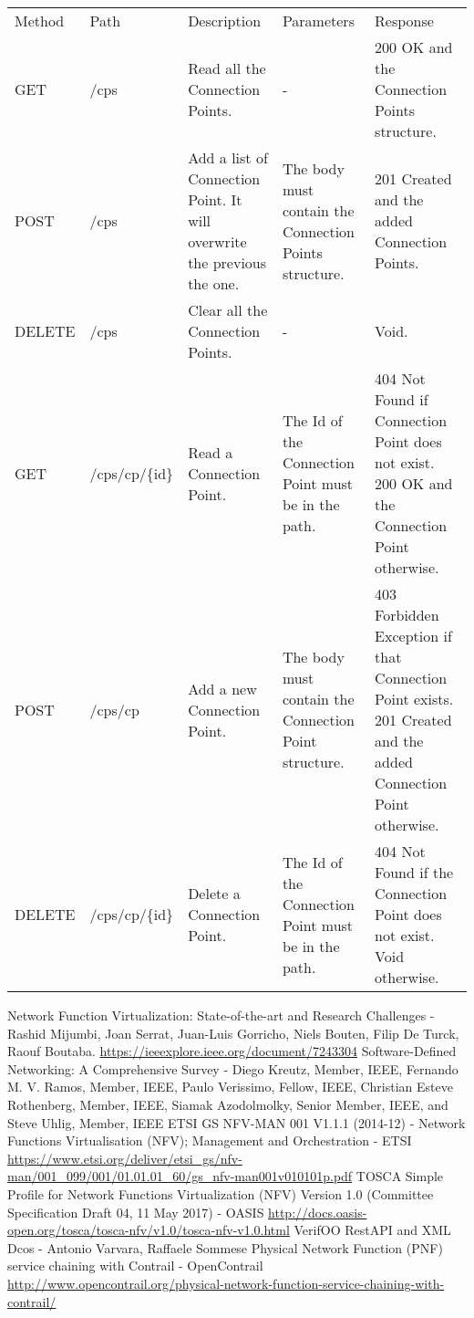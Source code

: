 \documentclass[11pt, english]{article}
\begin{document}
\begin{tabular}{ |p{2cm}|m{3cm}|p{3cm}|p{3cm}|p{4cm}| }
    \hline
    \rowcolor{black} \multicolumn{5}{|c|}{\textcolor{white}{ConnectionPoints}} \\
    \hline
    \rowcolor{Gray}
    Method & Path & Description & Parameters & Response \\
    \hline
    GET   & /cps & Read all the Connection Points. & - & 200 OK and the Connection Points structure. \\
    \hline
    POST & /cps & Add a list of Connection Point. It will overwrite the previous the one. & The body must contain the Connection Points structure. & 201 Created and the added Connection Points. \\
    \hline
    DELETE & /cps & Clear all the Connection Points. & - & Void. \\
    \hline
    GET & /cps/cp/\{id\} & Read a Connection Point. & The Id of the Connection Point must be in the path. & 404 Not Found if Connection Point does not exist. 200 OK and the Connection Point otherwise. \\
    \hline
    POST & /cps/cp & Add a new Connection Point. & The body must contain the Connection Point structure. & 403 Forbidden Exception if that Connection Point exists. 201 Created and the added Connection Point otherwise. \\
    \hline
    DELETE & /cps/cp/\{id\} & Delete a Connection Point. & The Id of the Connection Point must be in the path. & 404 Not Found if the Connection Point does not exist. Void otherwise. \\
    \hline
\end{tabular}

\newpage
\begin{thebibliography}{5}
        Network Function Virtualization: State-of-the-art and Research Challenges - Rashid Mijumbi, Joan Serrat, Juan-Luis Gorricho, Niels Bouten, Filip De Turck, Raouf Boutaba.
        \url{https://ieeexplore.ieee.org/document/7243304}
        Software-Defined Networking: A Comprehensive Survey - Diego Kreutz, Member, IEEE, Fernando M. V. Ramos, Member, IEEE, Paulo Verissimo, Fellow, IEEE, Christian Esteve Rothenberg, Member, IEEE, Siamak Azodolmolky, Senior Member, IEEE, and Steve Uhlig, Member, IEEE
        ETSI GS NFV-MAN 001 V1.1.1 (2014-12) - Network Functions Virtualisation (NFV); Management and Orchestration - ETSI
        \url{https://www.etsi.org/deliver/etsi_gs/nfv-man/001_099/001/01.01.01_60/gs_nfv-man001v010101p.pdf}
        TOSCA Simple Profile for Network Functions Virtualization (NFV) Version 1.0 (Committee Specification Draft 04, 11 May 2017) - OASIS
        \url{http://docs.oasis-open.org/tosca/tosca-nfv/v1.0/tosca-nfv-v1.0.html}
        VerifOO RestAPI and XML Dcos - Antonio Varvara, Raffaele Sommese
        Physical Network Function (PNF) service chaining with Contrail - OpenContrail
        \url{http://www.opencontrail.org/physical-network-function-service-chaining-with-contrail/}
\end{thebibliography}
\end{document}
